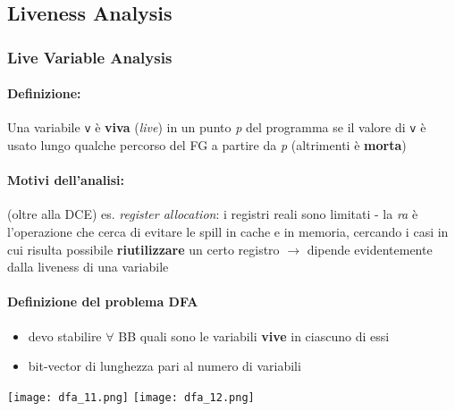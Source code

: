 \subsection{Liveness Analysis}

\subsubsection{Live Variable Analysis}

\noindent\begin{minipage}[c]{.7\textwidth}
\paragraph{Definizione:}

Una variabile \lstinline|v| \`e \textbf{viva} (\textit{live}) in un punto \textit{p} del programma se il valore di \lstinline|v| \`e usato lungo qualche percorso del FG a partire da \textit{p} (altrimenti \`e \textbf{morta})\\

\paragraph{Motivi dell'analisi:}

(oltre alla DCE) es. \textit{register allocation}: i registri reali sono limitati - la \textit{ra} \`e l'operazione che cerca di evitare le spill in cache e in memoria, cercando i casi in cui risulta possibile \textbf{riutilizzare} un certo registro $\rightarrow$ dipende evidentemente dalla liveness di una variabile\\

\paragraph{Definizione del problema DFA}

\begin{itemize}
  \item devo stabilire $\forall$ BB quali sono le variabili \textbf{vive} in ciascuno di essi
  \item bit-vector di lunghezza pari al numero di variabili
\end{itemize}
\end{minipage}
\begin{minipage}[c]{.3\textwidth}
\texttt{[image: dfa\_11.png]}
\texttt{[image: dfa\_12.png]}
\end{minipage}

